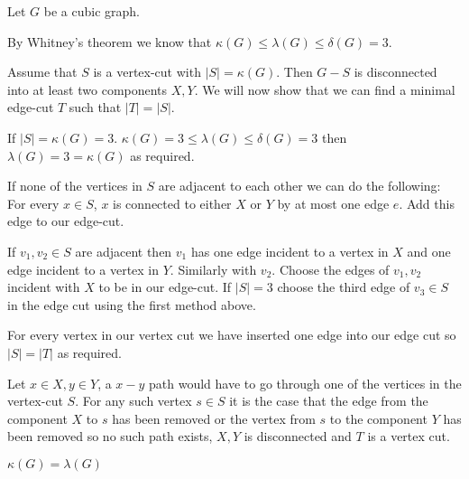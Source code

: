 Let $G$ be a cubic graph. 

By Whitney's theorem we know that $\kappa(G) \le \lambda(G) \le \delta(G) = 3 $.

Assume that $S$ is a vertex-cut with $|S| = \kappa(G)$. Then
$G-S$ is disconnected into at least two components $X, Y$. 
We will now show that we can find a minimal edge-cut $T$ such that $|T| = |S|$.

If $|S| = \kappa(G) = 3$. $\kappa(G) = 3 \le \lambda(G) \le \delta(G) = 3$
then $\lambda(G) = 3 = \kappa(G)$ as required.

If none of the vertices in $S$ are adjacent to each other we can do the following:
For every $x \in S$, $x$ is connected to either $X$ or $Y$ by at most one edge $e$. 
Add this edge to our edge-cut.

If $v_1, v_2 \in S$ are adjacent then $v_1$ has one edge incident to a vertex 
in $X$ and one edge incident to a vertex in $Y$. Similarly with $v_2$. Choose 
the edges of $v_1, v_2$ incident with $X$ to be in our edge-cut. If $|S| = 3$ 
choose the third edge of $v_3 \in S$ in the edge cut using the first method 
above. 


For every vertex in our vertex cut we have inserted one edge into our edge
cut so $|S| = |T|$ as required. 

Let $x\in X, y \in Y$, a $x-y$ path would have to go through one of the
vertices in the vertex-cut $S$. For any such vertex $s \in S$ it is the
case that the edge from the component $X$ to $s$ has been removed or the
vertex from $s$ to the component $Y$ has been removed so no such path
exists, $X, Y$ is disconnected and $T$ is a vertex cut. 

$\kappa(G) = \lambda(G)$
